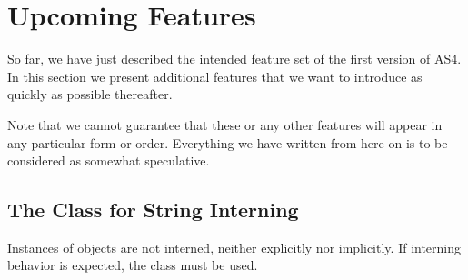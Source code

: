 



\section{Upcoming Features}
\label{upcoming}
So far, we have just described the intended feature set of the first version of
AS4. In this section we present additional features that we want to introduce as
quickly as possible thereafter.

Note that we cannot guarantee that these or any other features will appear in
any particular form or order. Everything we have written from here on is to be
considered as somewhat speculative.

\subsection{The  Class for String Interning}
Instances of  objects are not interned, neither explicitly nor
implicitly. If interning behavior is expected, the  class must be
used.

